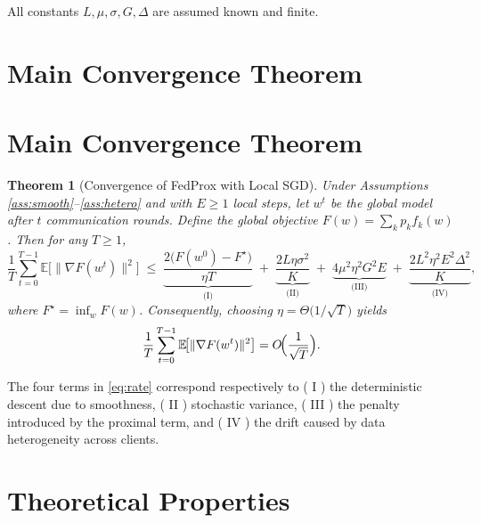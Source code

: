 \documentclass{article}
\newcommand{\E}{\mathbb{E}}
\newtheorem{theorem}{Theorem}
\begin{document}
All constants $L,\mu,\sigma,G,\Delta$ are assumed known and finite.

\section*{Main Convergence Theorem}
\section{Main Convergence Theorem}
\begin{theorem}[Convergence of FedProx with Local SGD]\label{thm:main}
Under Assumptions \ref{ass:smooth}–\ref{ass:hetero} and with $E\ge 1$ local
steps, let $w^{t}$ be the global model after $t$ communication rounds.
Define the global objective $F(w)=\sum_{k}p_k f_k(w)$.  Then for any
$T\ge 1$,
\begin{equation}
\frac{1}{T}\sum_{t=0}^{T-1}\E\!\bigl[\|\nabla F(w^{t})\|^{2}\bigr]
\;\le\;
\underbrace{\frac{2\bigl(F(w^{0})-F^{\star}\bigr)}{\eta T}}_{\text{(I)}}
\;+\;
\underbrace{ \frac{2L\eta\sigma^{2}}{K}}_{\text{(II)}}
\;+\;
\underbrace{ 4\mu^{2} \eta^{2} G^{2}E}_{\text{(III)}}
\;+\;
\underbrace{ \frac{2L^{2}\eta^{2}E^{2}\Delta^{2}}{K}}_{\text{(IV)}},
\label{eq:rate}
\end{equation}
where $F^{\star}=\inf_{w}F(w)$.
Consequently, choosing $\eta = \Theta\!\bigl(1/\sqrt{T}\bigr)$ yields
\[
\frac{1}{T}\sum_{t=0}^{T-1}\E\!\bigl[\|\nabla F(w^{t})\|^{2}\bigr]
= O\!\Bigl(\frac{1}{\sqrt{T}}\Bigr).
\]
\end{theorem}
The four terms in \eqref{eq:rate} correspond respectively to
( I ) the deterministic descent due to smoothness,
( II ) stochastic variance,
( III ) the penalty introduced by the proximal term,
and ( IV ) the drift caused by data heterogeneity across clients.

\section*{Theoretical Properties}
\end{document}
